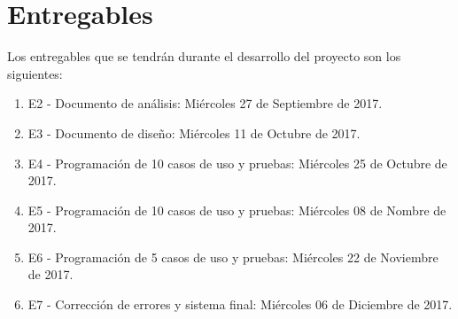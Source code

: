 \section{Entregables}

Los entregables que se tendrán durante el desarrollo del proyecto son los siguientes:

\begin{enumerate}
	\item E2 - Documento de análisis: Miércoles 27 de Septiembre de 2017.
	\item E3 - Documento de diseño: Miércoles 11 de Octubre de 2017.
	\item E4 - Programación de 10 casos de uso y pruebas: Miércoles 25 de Octubre de 2017.
	\item E5 - Programación de 10 casos de uso y pruebas: Miércoles 08 de Nombre de 2017.
	\item E6 - Programación de 5 casos de uso y pruebas: Miércoles 22 de Noviembre de 2017.
	\item E7 - Corrección de errores y sistema final: Miércoles 06 de Diciembre de 2017.
\end{enumerate}

